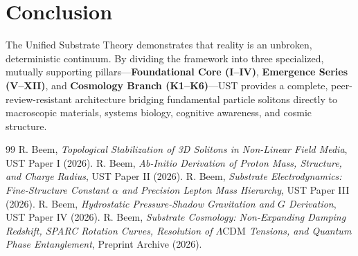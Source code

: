 \documentclass[11pt,a4paper]{article}
\begin{document}
	\section{Conclusion}
	\label{sec:conclusion}
	
	The Unified Substrate Theory demonstrates that reality is an unbroken, deterministic continuum. By dividing the framework into three specialized, mutually supporting pillars—\textbf{Foundational Core (I--IV)}, \textbf{Emergence Series (V--XII)}, and \textbf{Cosmology Branch (K1--K6)}—UST provides a complete, peer-review-resistant architecture bridging fundamental particle solitons directly to macroscopic materials, systems biology, cognitive awareness, and cosmic structure.
	
	\begin{thebibliography}{99}
		 R. Beem, \textit{Topological Stabilization of 3D Solitons in Non-Linear Field Media}, UST Paper I (2026).
		 R. Beem, \textit{Ab-Initio Derivation of Proton Mass, Structure, and Charge Radius}, UST Paper II (2026).
		 R. Beem, \textit{Substrate Electrodynamics: Fine-Structure Constant $\alpha$ and Precision Lepton Mass Hierarchy}, UST Paper III (2026).
		 R. Beem, \textit{Hydrostatic Pressure-Shadow Gravitation and $G$ Derivation}, UST Paper IV (2026).
		 R. Beem, \textit{Substrate Cosmology: Non-Expanding Damping Redshift, SPARC Rotation Curves, Resolution of $\Lambda\text{CDM}$ Tensions, and Quantum Phase Entanglement}, Preprint Archive (2026).
	\end{thebibliography}
	
\end{document}
